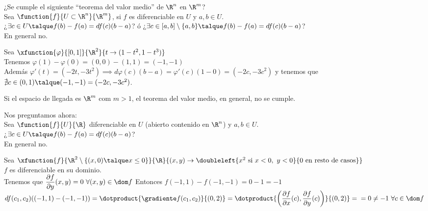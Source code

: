 	\begin{observacion} ¿Se cumple el siguiente ``teorema del valor medio'' de $\R^n$ en $\R^m$?\\
	Sea $\function{f}{U\subset\R^n}{\R^m}$, si $f$ es diferenciable en $U$ y $a,b\in U$.\\
	¿$\exists c\in U\talque f(b)-f(a)=df(c)(b-a)$? ó ¿$\exists c \in [a,b]\setminus\{a,b\}\talque f(b)-f(a)=df(c)(b-a)$?\\
	En general no.
	\begin{ejem} Sea $\xfunction{\varphi}{[0,1]}{\R^2}{t\to (1-t^2,1-t^3)}$\\
	Tenemos $\varphi(1)-\varphi(0) = (0,0)-(1,1)=(-1,-1)$\\
	Además $\varphi'(t)=(-2t,-3t^2)\implies d\varphi(c)(b-a)=\varphi'(c)(1-0)=(-2c,-3c^2)$ y tenemos que $\nexists c\in (0,1)\talque (-1,-1)=(-2c,-3c^2)$.
	\end{ejem}
	\begin{nota} Si el espacio de llegada es $\R^m$ com $m>1$, el teorema del valor medio, en general, no se cumple. \end{nota}
	\end{observacion}
	
	\begin{observacion} Nos preguntamos ahora:\\
	Sea $\function{f}{U}{\R}$ diferenciable en $U$ (abierto contenido en $\R^n$) y $a,b\in U$.\\
	¿$\exists c\in U\talque f(b)-f(a)=df(c)(b-a)$?\\
	En general no.
	\begin{ejem} Sea $\xfunction{f}{\R^2\setminus\{(x,0)\talque x\leq 0\}}{\R}{(x,y)\to \doubleleft{x^2\mathrm{\ si\ }x<0,\ y<0}{0\mathrm{\ en\ resto\ de\ casos}}}$\\
	$f$ es diferenciable en su dominio.\\
	Tenemos que $\dfrac{\partial f}{\partial y}(x,y)=0\ \forall(x,y)\in \dom f$
	Entonces $f(-1,1)-f(-1,-1)=0-1=-1$\\
	$df(c_1,c_2)((-1,1)-(-1,-1))=\dotproduct{\gradiente f(c_1,c_2)}{(0,2)}=\dotproduct{\left(\dfrac{\partial f}{\partial x}(c),\dfrac{\partial f}{\partial y}(c)\right)}{(0,2)}=\\=0\neq -1\ \forall c\in\dom f$
	\end{ejem}
	\end{observacion}
	
